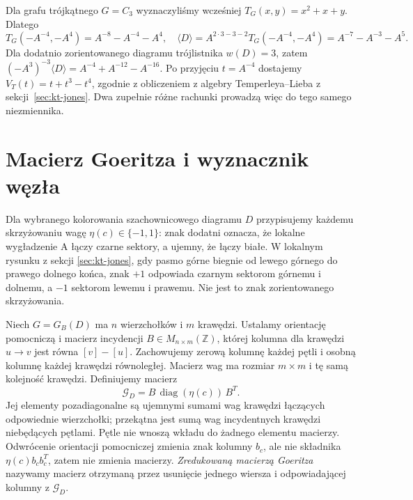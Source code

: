 \begin{przyklad}
Dla grafu trójkątnego $G=C_3$ wyznaczyliśmy wcześniej
$T_G(x,y)=x^2+x+y$. Dlatego
\[
T_G(-A^{-4},-A^4)=A^{-8}-A^{-4}-A^4,
\quad
\langle D\rangle=A^{2\cdot3-3-2}T_G(-A^{-4},-A^4)
=A^{-7}-A^{-3}-A^5.
\]
Dla dodatnio zorientowanego diagramu trójlistnika
$w(D)=3$, zatem
$(-A^3)^{-3}\langle D\rangle
=A^{-4}+A^{-12}-A^{-16}$.
Po przyjęciu $t=A^{-4}$ dostajemy
$V_T(t)=t+t^3-t^4$, zgodnie z obliczeniem
z algebry Temperleya--Lieba z sekcji~\ref{sec:kt-jones}.
Dwa zupełnie różne
rachunki prowadzą więc do tego samego niezmiennika.
\end{przyklad}

\section{Macierz Goeritza i wyznacznik węzła}
\label{sec:tg-goeritz}

\begin{definicja}
Dla wybranego kolorowania szachownicowego diagramu $D$
przypisujemy każdemu skrzyżowaniu wagę
$\eta(c)\in\{-1,1\}$: znak dodatni oznacza,
że lokalne wygładzenie A łączy czarne sektory,
a ujemny, że łączy białe. W lokalnym rysunku z sekcji
\ref{sec:kt-jones}, gdy pasmo górne biegnie od lewego
górnego do prawego dolnego końca, znak $+1$ odpowiada
czarnym sektorom górnemu i dolnemu, a $-1$ sektorom
lewemu i prawemu. Nie jest to znak zorientowanego skrzyżowania.

Niech $G=G_B(D)$ ma $n$ wierzchołków i $m$ krawędzi.
Ustalamy orientację pomocniczą i macierz incydencji
$B\in M_{n\times m}(\mathbb Z)$, której kolumna dla
krawędzi $u\to v$ jest równa $[v]-[u]$.
Zachowujemy zerową kolumnę każdej pętli i osobną
kolumnę każdej krawędzi równoległej. Macierz wag ma
rozmiar $m\times m$ i tę samą kolejność krawędzi.
Definiujemy macierz
\[
\mathcal G_D=B\,\operatorname{diag}(\eta(c))\,B^T.
\]
Jej elementy pozadiagonalne są ujemnymi sumami wag
krawędzi łączących odpowiednie wierzchołki; przekątna
jest sumą wag incydentnych krawędzi niebędących pętlami.
Pętle nie wnoszą wkładu do żadnego elementu macierzy.
Odwrócenie orientacji pomocniczej zmienia znak kolumny
$b_c$, ale nie składnika $\eta(c)b_cb_c^T$, zatem nie
zmienia macierzy. \emph{Zredukowaną
macierzą Goeritza} nazywamy macierz otrzymaną przez
usunięcie jednego wiersza i odpowiadającej kolumny
z $\mathcal G_D$.
\end{definicja}

